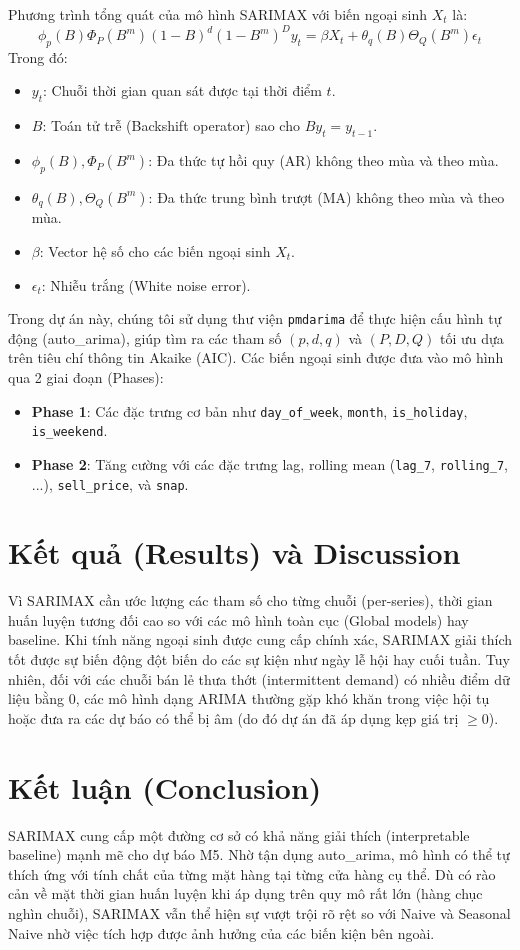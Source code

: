 \documentclass{article}
\begin{document}
Phương trình tổng quát của mô hình SARIMAX với biến ngoại sinh $X_t$ là:
\begin{equation}
\phi_p(B)\Phi_P(B^m)(1-B)^d(1-B^m)^D y_t = \beta X_t + \theta_q(B)\Theta_Q(B^m) \epsilon_t
\end{equation}
Trong đó:
\begin{itemize}
    \item $y_t$: Chuỗi thời gian quan sát được tại thời điểm $t$.
    \item $B$: Toán tử trễ (Backshift operator) sao cho $B y_t = y_{t-1}$.
    \item $\phi_p(B), \Phi_P(B^m)$: Đa thức tự hồi quy (AR) không theo mùa và theo mùa.
    \item $\theta_q(B), \Theta_Q(B^m)$: Đa thức trung bình trượt (MA) không theo mùa và theo mùa.
    \item $\beta$: Vector hệ số cho các biến ngoại sinh $X_t$.
    \item $\epsilon_t$: Nhiễu trắng (White noise error).
\end{itemize}

Trong dự án này, chúng tôi sử dụng thư viện \texttt{pmdarima} để thực hiện cấu hình tự động (auto\_arima), giúp tìm ra các tham số $(p,d,q)$ và $(P,D,Q)$ tối ưu dựa trên tiêu chí thông tin Akaike (AIC). Các biến ngoại sinh được đưa vào mô hình qua 2 giai đoạn (Phases):
\begin{itemize}
    \item \textbf{Phase 1}: Các đặc trưng cơ bản như \texttt{day\_of\_week}, \texttt{month}, \texttt{is\_holiday}, \texttt{is\_weekend}.
    \item \textbf{Phase 2}: Tăng cường với các đặc trưng lag, rolling mean (\texttt{lag\_7}, \texttt{rolling\_7}, ...), \texttt{sell\_price}, và \texttt{snap}.
\end{itemize}

\section{Kết quả (Results) và Discussion}
Vì SARIMAX cần ước lượng các tham số cho từng chuỗi (per-series), thời gian huấn luyện tương đối cao so với các mô hình toàn cục (Global models) hay baseline. Khi tính năng ngoại sinh được cung cấp chính xác, SARIMAX giải thích tốt được sự biến động đột biến do các sự kiện như ngày lễ hội hay cuối tuần. Tuy nhiên, đối với các chuỗi bán lẻ thưa thớt (intermittent demand) có nhiều điểm dữ liệu bằng $0$, các mô hình dạng ARIMA thường gặp khó khăn trong việc hội tụ hoặc đưa ra các dự báo có thể bị âm (do đó dự án đã áp dụng kẹp giá trị $\ge 0$).

\section{Kết luận (Conclusion)}
SARIMAX cung cấp một đường cơ sở có khả năng giải thích (interpretable baseline) mạnh mẽ cho dự báo M5. Nhờ tận dụng auto\_arima, mô hình có thể tự thích ứng với tính chất của từng mặt hàng tại từng cửa hàng cụ thể. Dù có rào cản về mặt thời gian huấn luyện khi áp dụng trên quy mô rất lớn (hàng chục nghìn chuỗi), SARIMAX vẫn thể hiện sự vượt trội rõ rệt so với Naive và Seasonal Naive nhờ việc tích hợp được ảnh hưởng của các biến kiện bên ngoài.
\end{document}
